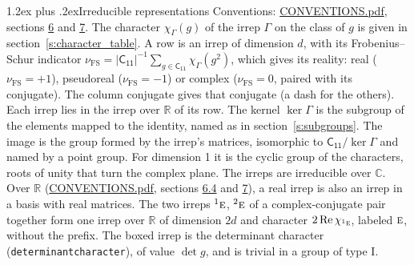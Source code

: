 \documentclass[10pt,a4paper]{article}
\makeatletter
\renewcommand\section{\@startsection{section}{1}{\z@}{-3ex plus -1ex minus -.2ex}%
  {1.2ex plus .2ex}{\normalfont\large\sffamily\bfseries\color{parttitle}}}
\numberwithin{equation}{section}
\newcommand{\grp}[1]{\mathsf{#1}}
\newcommand{\irr}[1]{\text{\normalfont\scshape #1}}
\newcommand{\conjpair}[1]{{}^{#1}}
\newcommand{\irchar}[1]{\chi_{#1}}
\newcommand{\fsind}{\nu_{\mathrm{FS}}}
\makeatother
\begin{document}
\section{Irreducible representations}\label{s:irreps}
Conventions: \href{../../CONVENTIONS.pdf}{CONVENTIONS.pdf}, sections \href{../../CONVENTIONS.pdf\#conv.6}{6} and \href{../../CONVENTIONS.pdf\#conv.7}{7}.
\leavevmode\label{n:function.character}\label{n:irrep.Gamma}The character $\irchar{\Gamma}(g)$ of the irrep $\Gamma$ on the class of $g$ is given in section~\ref{s:character_table}.
\leavevmode\label{n:index.dimension}\label{n:index.frobenius}\label{n:head.irrep}\label{n:head.reality}A row is an irrep of dimension $d$, with its Frobenius--Schur indicator $\fsind = |\grp{C_{11}}|^{-1}\allowbreak\sum_{g\in\grp{C_{11}}}\irchar{\Gamma}(g^2)$, which gives its reality: real ($\fsind = +1$), pseudoreal ($\fsind = -1$) or complex ($\fsind = 0$, paired with its conjugate). \label{n:head.conjugate}The column conjugate gives that conjugate (a dash for the others). \label{n:head.over.real}Each irrep lies in the irrep over $\mathbb{R}$ of its row. \label{n:head.kernel}The kernel $\ker\Gamma$ is the subgroup of the elements mapped to the identity, named as in section~\ref{s:subgroups}. \label{n:head.image}The image is the group formed by the irrep's matrices, isomorphic to $\grp{C_{11}}/\ker\Gamma$ and named by a point group. For dimension 1 it is the cyclic group of the characters, roots of unity that turn the complex plane. The irreps are irreducible over $\mathbb{C}$. Over $\mathbb{R}$ (\href{../../CONVENTIONS.pdf}{CONVENTIONS.pdf}, sections \href{../../CONVENTIONS.pdf\#conv.6.4}{6.4} and \href{../../CONVENTIONS.pdf\#conv.7}{7}), a real irrep is also an irrep in a basis with real matrices. The two irreps $\conjpair{1}\irr{e}$, $\conjpair{2}\irr{e}$ of a complex-conjugate pair together form one irrep over $\mathbb{R}$ of dimension $2d$ and character $2\operatorname{Re}\irchar{\conjpair{1}\irr{e}}$, labeled $\irr{e}$, without the prefix. \label{n:mark.determinant}The boxed irrep is the determinant character (\texttt{determinantcharacter}), of value $\det g$, and is trivial in a group of type I.
\setlength{\emergencystretch}{2em}\par\setlength{\emergencystretch}{0pt}
\end{document}
